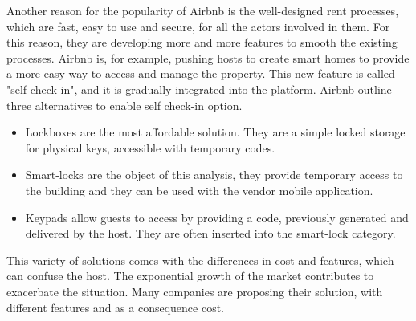 Another reason for the popularity of Airbnb is the well-designed rent processes, which are fast, easy to use and secure, for all the actors involved in them. For this reason, they are developing more and more features to smooth the existing processes. Airbnb is, for example, pushing hosts to create smart homes to provide a more easy way to access and manage the property\cite{airbnb-smart}. This new feature is called "self check-in", and it is gradually integrated into the platform. Airbnb outline three alternatives to enable self check-in option.
\begin{itemize}
    \item Lockboxes are the most affordable solution. They are a simple locked storage for physical keys, accessible with temporary codes.
    \item Smart-locks are the object of this analysis, they provide temporary access to the building and they can be used with the vendor mobile application.
    \item Keypads allow guests to access by providing a code, previously generated and delivered by the host. They are often inserted into the smart-lock category.
\end{itemize}
This variety of solutions comes with the differences in cost and features, which can confuse the host. The exponential growth of the market contributes to exacerbate the situation. Many companies are proposing their solution, with different features and as a consequence cost. 

